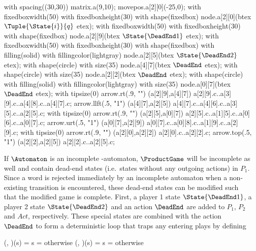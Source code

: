     with spacing((30,30)) matrix.a(9,10);
    movepos.a[2][0](-25,0);
    with fixedboxwidth(50) with fixedboxheight(30) with shape(fixedbox) node.a[2][0](btex $\Tuple{\State{i}}{q}$ etex);
    with fixedboxwidth(50) with fixedboxheight(30) with shape(fixedbox) node.a[2][9](btex $\State{\DeadEnd1}$ etex);
    with fixedboxwidth(50) with fixedboxheight(30) with shape(fixedbox) with filling(solid) with fillingcolor(lightgray) node.a[2][5](btex $\State{\DeadEnd2}$ etex);
    with shape(circle) with size(35) node.a[4][7](btex \ssd $\DeadEnd$ etex);
    with shape(circle) with size(35) node.a[2][2](btex \ssd $\DeadEnd$ etex);
    with shape(circle) with filling(solid) with fillingcolor(lightgray) with size(35) node.a[0][7](btex \ssd $\DeadEnd$ etex);
    with tipsize(0) arrow.rt(.9, "") (a[2][9],a[4][7]) a[2][9].c..a[3][9].c..a[4][8].c..a[4][7].c;
    arrow.llft(.5, "1") (a[4][7],a[2][5]) a[4][7].c..a[4][6].c..a[3][5].c..a[2][5].c;
    with tipsize(0) arrow.rt(.9, "") (a[2][5],a[0][7]) a[2][5].c..a[1][5].c..a[0][6].c..a[0][7].c;
    arrow.urt(.5, "1") (a[0][7],a[2][9]) a[0][7].c..a[0][8].c..a[1][9].c..a[2][9].c;
    with tipsize(0) arrow.rt(.9, "") (a[2][0],a[2][2]) a[2][0].c..a[2][2].c;
    arrow.top(.5, "1") (a[2][2],a[2][5]) a[2][2].c..a[2][5].c;
\stopreusableMPgraphic

\startsubsection[title={Dead-end States},reference=sec:abstraction-product-deadends]


    If $\Automaton$ is an incomplete \omega-automaton, $\ProductGame$ will be incomplete as well and contain dead-end states (i.e.\ states without any outgoing actions) in $P_1$.
    Since a word is rejected immediately by an incomplete automaton when a non-existing transition is encountered, these dead-end states can be modified such that the modified game is complete.
    First, a player 1 state $\State{\DeadEnd1}$, a player 2 state $\State{\DeadEnd2}$ and an action $\DeadEnd$ are added to $P_1$, $P_2$ and $Act$, respectively.
    These special states are combined with the action $\DeadEnd$ to form a deterministic loop that traps any entering plays by defining

    \startformula
        \startalign[n=2,align={right,left}]
            \NC \Transition(, \DeadEnd)(s) =
            \NC \startmathcases
                    \MC \StartIf s = 
                    \NR
                    \NC otherwise
                    \NR
                \stopmathcases \EndAnd
            \NR
            \NC \Transition(, \DeadEnd)(s) =
            \NC \startmathcases
                    \MC \StartIf s = 
                    \NR
                    \NC otherwise
                    \NR
                \stopmathcases \EndPeriod
            \NR
        \stopalign
    \stopformula

